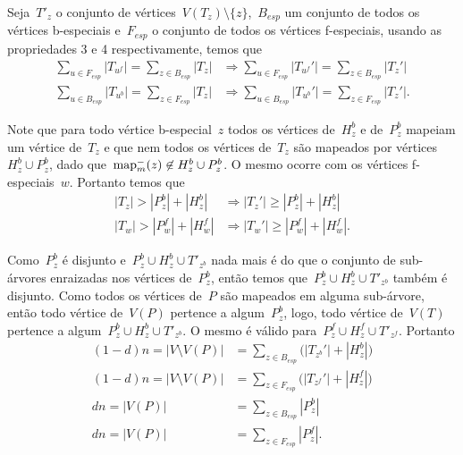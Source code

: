 	Seja~$T'_z$ o conjunto de 
	vértices~${V(T_z)\setminus \{z\}}$,~$B_{esp}$ 
	um conjunto de todos os vértices b-especiais e~$F_{esp}$ o
	conjunto de todos os vértices f-especiais, usando as propriedades 
	3 e 4 respectivamente, temos que
	\begin{align}
		\displaystyle\sum_{u\in F_{esp}}|T_{u^f}| = 
		\displaystyle\sum_{z\in B_{esp}}|T_{z}| %
		&\Rightarrow
		\displaystyle\sum_{u\in F_{esp}}|T_{u^f}'| = 
		\displaystyle\sum_{z\in B_{esp}}|T_{z}'| \label{eq:4}\\
		\displaystyle\sum_{u\in B_{esp}}|T_{u^b}| = 
		\displaystyle\sum_{z\in F_{esp}}|T_{z}| %
		&\Rightarrow
		\displaystyle\sum_{u\in B_{esp}}|T_{u^b}'| = 
		\displaystyle\sum_{z\in F_{esp}}|T_{z}'| \label{eq:3}.
	\end{align}

	Note que para todo vértice b-especial~$z$ todos os vértices 
	de~$H^b_z$ e de~$P^b_z$ mapeiam um vértice 
	de~$T_z$ e que nem todos os vértices de~$T_z$ são mapeados por
	vértices~$H^b_z\cup P_z^b$, 
	dado que~$\mathrm{map}^-_m(z)\not\in H^b_z\cup P_z^b$.
	O mesmo ocorre com os vértices f-especiais~$w$.
	Portanto temos que
	\begin{align}
		|T_z| > |P^b_z| + |H^b_z| 
		&\Rightarrow
		|T_z'| \ge |P^b_z| + |H^b_z| \label{eq:5}\\
		|T_w| > |P^f_w| + |H^f_w|
		&\Rightarrow
		|T_w'| \ge |P^f_w| + |H^f_w| \label{eq:6}.
	\end{align}

	Como~$P^b_z$ é disjunto e~$P^b_z\cup H^b_z\cup T'_{z^b}$
	nada mais é do que o conjunto de sub-árvores enraizadas
	nos vértices de~$P^b_z$, então temos 
	que~${P^b_z\cup H^b_z\cup T'_{z^b}}$ também é disjunto.
	Como todos os vértices de~$P$ são mapeados em alguma sub-árvore,
	então todo vértice de~$V(P)$ pertence a algum~$P^b_z$, logo,
	todo vértice de~$V(T)$ pertence a 
	algum~${P^b_z\cup H^b_z\cup T'_{z^b}}$.
	O mesmo é válido para~${P^f_z\cup H^f_z\cup T'_{z^f}}$.
	Portanto
	\begin{align}
		(1-d)n = |V\setminus V(P)| &= 
		\displaystyle\sum_{z\in B_{esp}}\Big(|T_{z^b}'|+|H_z^b|\Big)
		\label{eq:7}\\
		(1-d)n = |V\setminus V(P)| &= 
		\displaystyle\sum_{z\in F_{esp}}\Big(|T_{z^f}'|+|H_z^f|\Big)
		\label{eq:9}\\
		dn = |V(P)| &= 
		\displaystyle\sum_{z\in B_{esp}}|P_z^b|
		\label{eq:8}\\
		dn = |V(P)| &= 
		\displaystyle\sum_{z\in F_{esp}}|P_z^f| 
		\label{eq:10}.
	\end{align}

